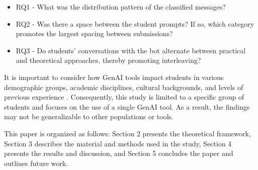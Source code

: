 \documentclass[a4paper,twoside]{article}
\begin{document}
\begin{itemize}
  \item RQ1 - What was the distribution pattern of the classified messages?
  \item RQ2 - Was there a space between the student prompts? If so, which
  category promotes the largest spacing between submissions?
  \item RQ3 - Do students' conversations with the bot alternate between
  practical and theoretical approaches, thereby promoting interleaving?
\end{itemize}


It is important to consider how GenAI tools impact students in
various demographic groups, academic disciplines, cultural backgrounds, and
levels of previous experience \citep{catalan21} \citep{neo22}. Consequently,
this study is limited to a specific group of students and focuses on the use of
a single GenAI tool. As a result, the findings may not be generalizable to other
populations or tools.

This paper is organized as follows: Section 2 presents the theoretical
framework, Section 3 describes the material and methods used in the study,
Section 4 presents the results and discussion, and Section 5 concludes the
paper and outlines future work.



\end{document}
